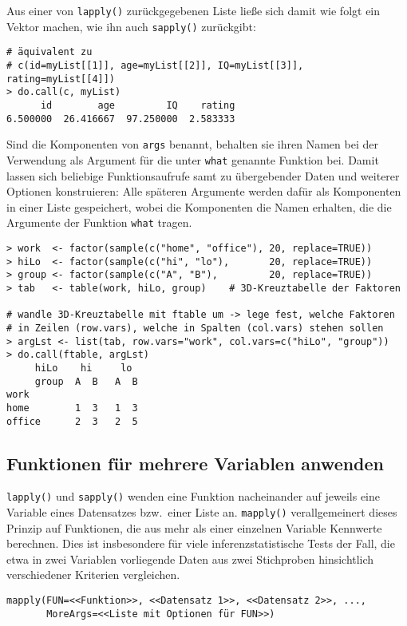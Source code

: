 Aus einer von \lstinline!lapply()! zurückgegebenen Liste ließe sich damit wie folgt ein Vektor machen, wie ihn auch \lstinline!sapply()! zurückgibt:
\begin{lstlisting}
# äquivalent zu
# c(id=myList[[1]], age=myList[[2]], IQ=myList[[3]], rating=myList[[4]])
> do.call(c, myList)
      id        age         IQ    rating
6.500000  26.416667  97.250000  2.583333
\end{lstlisting}

Sind die Komponenten von \lstinline!args! benannt, behalten sie ihren Namen bei der Verwendung als Argument für die unter \lstinline!what! genannte Funktion bei. Damit lassen sich beliebige Funktionsaufrufe samt zu übergebender Daten und weiterer Optionen konstruieren: Alle späteren Argumente werden dafür als Komponenten in einer Liste gespeichert, wobei die Komponenten die Namen erhalten, die die Argumente der Funktion \lstinline!what! tragen.
\begin{lstlisting}
> work  <- factor(sample(c("home", "office"), 20, replace=TRUE))
> hiLo  <- factor(sample(c("hi", "lo"),       20, replace=TRUE))
> group <- factor(sample(c("A", "B"),         20, replace=TRUE))
> tab   <- table(work, hiLo, group)    # 3D-Kreuztabelle der Faktoren

# wandle 3D-Kreuztabelle mit ftable um -> lege fest, welche Faktoren
# in Zeilen (row.vars), welche in Spalten (col.vars) stehen sollen
> argLst <- list(tab, row.vars="work", col.vars=c("hiLo", "group"))
> do.call(ftable, argLst)
     hiLo    hi     lo
     group  A  B   A  B
work
home        1  3   1  3
office      2  3   2  5
\end{lstlisting}

\subsection{Funktionen für mehrere Variablen anwenden}

\lstinline!lapply()! und \lstinline!sapply()! wenden eine Funktion nacheinander auf jeweils eine Variable eines Datensatzes bzw.\ einer Liste an. \lstinline!mapply()! verallgemeinert dieses Prinzip auf Funktionen, die aus mehr als einer einzelnen Variable Kennwerte berechnen. Dies ist insbesondere für viele inferenzstatistische Tests der Fall, die etwa in zwei Variablen vorliegende Daten aus zwei Stichproben hinsichtlich verschiedener Kriterien vergleichen.
\begin{lstlisting}
mapply(FUN=<<Funktion>>, <<Datensatz 1>>, <<Datensatz 2>>, ...,
       MoreArgs=<<Liste mit Optionen für FUN>>)
\end{lstlisting}

